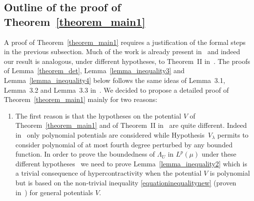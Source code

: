 \documentclass[a4paper,10pt]{article}
\newenvironment{enumeratenumeric}{\begin{enumerate}[1.] }{\end{enumerate}}
\begin{document}
\subsection{Outline of the proof of Theorem~\ref{theorem_main1}}

A proof of Theorem~\ref{theorem_main1} requires a justification of the formal
steps in the previous subsection. Much of the work is already present
in~{\cite{Klein1984}} and indeed our result is analogous, under different
hypotheses, to Theorem~II in~{\cite{Klein1984}}. The proofs of
Lemma~\ref{theorem_det}, Lemma~\ref{lemma_inequality3} and
Lemma~\ref{lemma_inequality4} below follows the same ideas of Lemma~3.1,
Lemma~3.2 and Lemma~3.3 in~{\cite{Klein1984}}. We decided to propose a
detailed proof of Theorem~\ref{theorem_main1} mainly for two reasons:
\begin{enumeratenumeric}
  \item The first reason is that the hypotheses on the potential $V$ of
  Theorem~\ref{theorem_main1} and of Theorem~II in~{\cite{Klein1984}} are
  quite different. Indeed in~{\cite{Klein1984}} only polynomial potentials are
  considered while Hypothesis~$V_{\lambda}$ permits to consider polynomial of
  at most fourth degree perturbed by any bounded function. In order to prove
  the boundedness of $\Lambda_U$ in $L^p (\mu)$ under these different
  hypotheses \ we need to prove Lemma~\ref{lemma_inequality2} which is a
  trivial consequence of hypercontractivity when the potential $V$ is
  polynomial but is based on the non-trivial inequality
  {\eqref{equationinequalitynew}} (proven in~{\cite{Ustunel2000}}) for general
  potentials $V$.
  

\end{enumeratenumeric}
\end{document}
